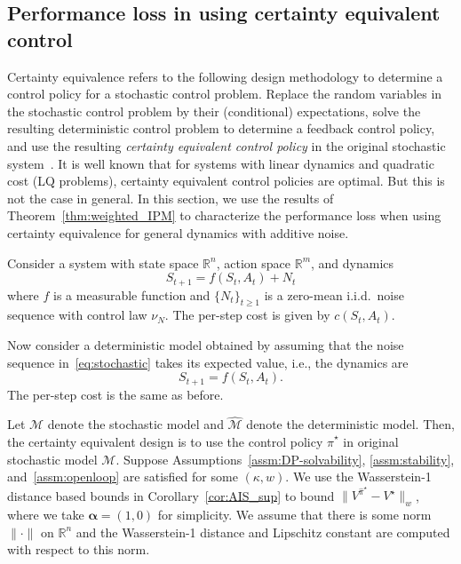 \documentclass[letterpaper, 10pt]{IEEEtran}
\newcommand*\ALPHABET{\mathcal}
\newcommand*\reals{\mathds{R}}
\newcommand*\tuple{\kappa, w}
\begin{document}
\subsection{Performance loss in using certainty equivalent control}

Certainty equivalence refers to the following design methodology to determine a control policy for a stochastic control problem. Replace the random variables  in the stochastic control problem by their (conditional) expectations, solve the resulting deterministic control problem to determine a feedback control policy, and use the resulting \emph{certainty equivalent control policy} in the original stochastic system~\cite{simon1956dynamic,theil1957note}. It is well known that for systems with linear dynamics and quadratic cost (LQ problems), certainty equivalent control policies are optimal. But this is not the case in general. In this section, we use the results of Theorem~\ref{thm:weighted_IPM} to characterize the performance loss when using certainty equivalence for general dynamics with additive noise. 

Consider a system with state space $\reals^n$, action space $\reals^m$, and dynamics 
\begin{equation}\label{eq:stochastic}
    S_{t+1} = f(S_t, A_t) + N_t
\end{equation}
where $f$ is a measurable function and $\{N_t\}_{t \ge 1}$ is a zero-mean i.i.d.\ noise sequence with control law $\nu_N$. The per-step cost is given by $c(S_t, A_t)$. 

Now consider a deterministic model obtained by assuming that the  noise sequence in~\eqref{eq:stochastic} takes its expected value, i.e., the dynamics are 
\begin{equation}\label{eq:deterministic}
    S_{t+1} = f(S_t, A_t).
\end{equation}
The per-step cost is the same as before. 

Let $\ALPHABET M$ denote the stochastic model and $\hat {\ALPHABET M}$ denote the deterministic model. Then, the certainty equivalent design is to use the control policy $\hat \pi^\star$ in original stochastic model $\ALPHABET M$. Suppose Assumptions~\ref{assm:DP-solvability}, \ref{assm:stability}, and~\ref{assm:openloop} are satisfied for some $(\tuple)$. We use the Wasserstein-1 distance based bounds in Corollary~\ref{cor:AIS_sup} to bound $\| V^{\hat \pi^\star} - V^\star\|_w$, where we take $\boldsymbol{\alpha} = (1,0)$ for simplicity. We assume that there is some norm $\| \cdot \|$ on $\reals^n$ and the Wasserstein-1 distance and Lipschitz constant are computed with respect to this norm.
\end{document}
